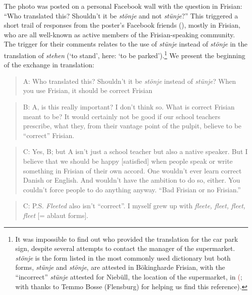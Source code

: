 \documentclass[output=paper]{langsci/langscibook}
\begin{document}
The photo was posted on a personal Facebook wall with the question in Frisian: “Who translated this? Shouldn’t it be \textit{stönje} and not \textit{stünje}?” This triggered a short trail of responses from the poster’s Facebook friends (), mostly in Frisian, who are all well-known as active members of the Frisian-speaking community. The trigger for their comments relates to the use of \textit{stünje} instead of \textit{stönje} in the translation of \textit{stehen} (‘to stand’, here: ‘to be parked’).\footnote{It was impossible to find out who provided the translation for the car park sign, despite several attempts to contact the manager of the supermarket. \textit{stönje} is the form listed in the most commonly used dictionary but both forms, \textit{stünje} and \textit{stönje}, are attested in Bökingharde Frisian, with the “incorrect” \textit{stünje} attested for Niebüll, the location of the supermarket, in \citeauthor{Walker1980} \textcolor{brown}{(}\citeyear[247]{Walker1980}; with thanks to Temmo Bosse (Flensburg) for helping us find this reference).} We present the beginning of the exchange in translation:

\begin{quote}
A: Who translated this? Shouldn’t it be \textit{stönje} instead of \textit{stünje}? When you use Frisian, it should be correct Frisian
\end{quote}

\begin{quote}
B: A, is this really important? I don’t think so. What is correct Frisian meant to be? It would certainly not be good if our school teachers prescribe, what they, from their vantage point of the pulpit, believe to be “correct” Frisian.
 
\end{quote}

\begin{quote}
C: Yes, B; but A isn’t just a school teacher but also a native speaker. But I believe that we should be happy [satisfied] when people speak or write something in Frisian of their own accord. One wouldn’t ever learn correct Danish or English. And wouldn’t have the ambition to do so, either. You couldn’t force people to do anything anyway. “Bad Frisian or no Frisian.”
\end{quote}

\begin{quote}
C: P.S. \textit{Fleeted} also isn’t “correct”. I myself grew up with \textit{fleete, fleet, fleet, fleet} [= ablaut forms]. 
\end{quote}
\end{document}
